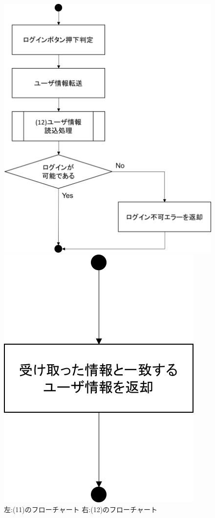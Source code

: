 \begin{figure}[htbp]
 \begin{minipage}{0.5\hsize}
  \begin{center}
   \includegraphics[width=0.9\linewidth,clip]{./img/flow/11.png}
  \end{center}
 \end{minipage}
 \begin{minipage}{0.5\hsize}
  \begin{center}
   \includegraphics[width=0.5\linewidth,clip]{./img/flow/12.png}
  \end{center}
 \end{minipage}
 \caption{左:(11)のフローチャート 右:(12)のフローチャート}\label{fig:11to12}
\end{figure}

